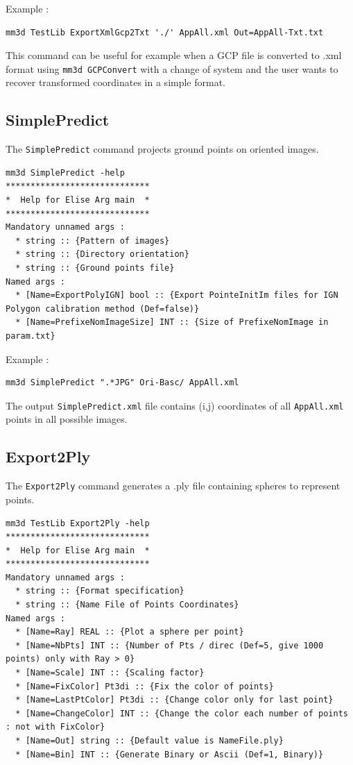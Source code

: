Example :
\begin{verbatim}
mm3d TestLib ExportXmlGcp2Txt './' AppAll.xml Out=AppAll-Txt.txt
\end{verbatim}

This command can be useful for example when a GCP file is converted to .xml format using {\tt mm3d GCPConvert} with a change of system and the user wants to recover transformed coordinates in a simple format.


\subsection{SimplePredict}
The {\tt SimplePredict} command projects ground points on oriented images.

\begin{verbatim}
mm3d SimplePredict -help
*****************************
*  Help for Elise Arg main  *
*****************************
Mandatory unnamed args : 
  * string :: {Pattern of images}
  * string :: {Directory orientation}
  * string :: {Ground points file}
Named args : 
  * [Name=ExportPolyIGN] bool :: {Export PointeInitIm files for IGN Polygon calibration method (Def=false)}
  * [Name=PrefixeNomImageSize] INT :: {Size of PrefixeNomImage in param.txt}
\end{verbatim}

Example :
\begin{verbatim}
mm3d SimplePredict ".*JPG" Ori-Basc/ AppAll.xml
\end{verbatim}

The output {\tt SimplePredict.xml} file contains (i,j) coordinates of all {\tt AppAll.xml} points in all possible images.

\subsection{Export2Ply}
The {\tt Export2Ply} command generates a .ply file containing spheres to represent points.

\begin{verbatim}
mm3d TestLib Export2Ply -help
*****************************
*  Help for Elise Arg main  *
*****************************
Mandatory unnamed args : 
  * string :: {Format specification}
  * string :: {Name File of Points Coordinates}
Named args : 
  * [Name=Ray] REAL :: {Plot a sphere per point}
  * [Name=NbPts] INT :: {Number of Pts / direc (Def=5, give 1000 points) only with Ray > 0}
  * [Name=Scale] INT :: {Scaling factor}
  * [Name=FixColor] Pt3di :: {Fix the color of points}
  * [Name=LastPtColor] Pt3di :: {Change color only for last point}
  * [Name=ChangeColor] INT :: {Change the color each number of points : not with FixColor}
  * [Name=Out] string :: {Default value is NameFile.ply}
  * [Name=Bin] INT :: {Generate Binary or Ascii (Def=1, Binary)}
\end{verbatim}

